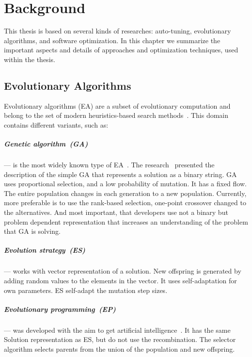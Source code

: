\chapter{Background}
\label{chapter:background}
This thesis is based on several kinds of researches: auto-tuning, evolutionary algorithms, and software optimization. In this chapter we summarize the important aspects and details of approaches and optimization techniques, used within the thesis.  

\section{Evolutionary Algorithms}
\label{sec:GeneticAlgorithm}

Evolutionary algorithms (EA) are a subset of evolutionary computation and belong to the set of modern heuristics-based search methods~\cite{vikhar16}.
This domain contains different variants, such as:
\paragraph{Genetic algorithm~(GA)} — is the most widely known type of EA~\cite{eiben03}. The research~\cite{deJong75} presented the description of the simple GA that represents a solution as a binary string. GA uses proportional selection, and a low probability of mutation. It has a fixed flow. The entire population changes in each generation to a new population. Currently, more preferable is to use the rank-based selection, one-point crossover changed to the alternatives. And most important, that developers use not a binary but problem dependent representation that increases an understanding of the problem that GA is solving.
\paragraph{Evolution strategy~(ES)} — works with vector representation of a solution. New offspring is generated by adding random values to the elements in the vector. It uses self-adaptation for own parameters. ES self-adapt the mutation step sizes.
\paragraph{Evolutionary programming~(EP)} — was developed with the aim to get artificial intelligence~\cite{eiben03}. It has the same Solution representation as ES, but do not use the recombination. The selector algorithm selects parents from the union of the population and new offspring.
